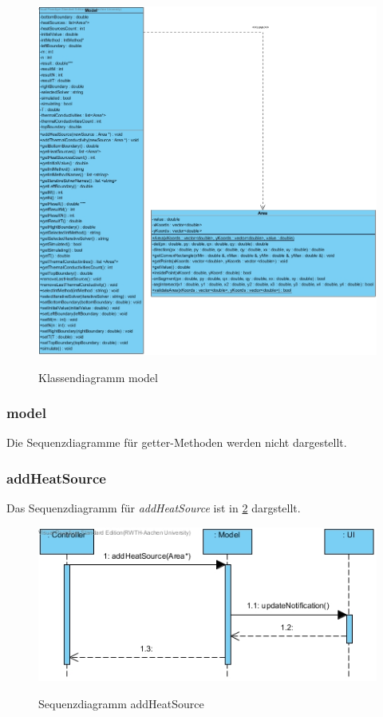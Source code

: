 \begin{figure}[H]
	\centering
	\includegraphics[scale=.6]{Bilder/model.jpg}\\
	\caption{Klassendiagramm model}
	\label{Klassendiagramm model}
\end{figure}

\subsubsection{model}

Die Sequenzdiagramme für getter-Methoden werden nicht dargestellt.

\subsubsection*{addHeatSource}

Das Sequenzdiagramm für \emph{addHeatSource} ist in \ref{Sequenzdiagramm addHeatSource} dargstellt.

\begin{figure}[H]
	\centering
	\includegraphics[scale=.6]{Bilder/Model__addHeatSource().jpg}\\
	\caption{Sequenzdiagramm addHeatSource}
	\label{Sequenzdiagramm addHeatSource}
\end{figure}

